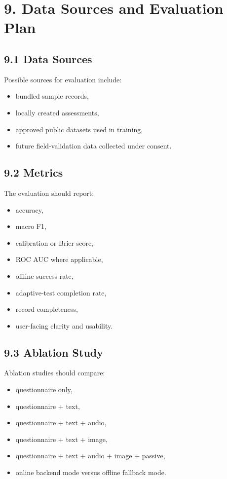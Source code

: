 \documentclass[11pt]{article}
\begin{document}
\section{9. Data Sources and Evaluation Plan}
\subsection{9.1 Data Sources}
Possible sources for evaluation include:
\begin{itemize}[leftmargin=*]
  \item bundled sample records,
  \item locally created assessments,
  \item approved public datasets used in training,
  \item future field-validation data collected under consent.
\end{itemize}

\subsection{9.2 Metrics}
The evaluation should report:
\begin{itemize}[leftmargin=*]
  \item accuracy,
  \item macro F1,
  \item calibration or Brier score,
  \item ROC AUC where applicable,
  \item offline success rate,
  \item adaptive-test completion rate,
  \item record completeness,
  \item user-facing clarity and usability.
\end{itemize}

\subsection{9.3 Ablation Study}
Ablation studies should compare:
\begin{itemize}[leftmargin=*]
  \item questionnaire only,
  \item questionnaire + text,
  \item questionnaire + text + audio,
  \item questionnaire + text + image,
  \item questionnaire + text + audio + image + passive,
  \item online backend mode versus offline fallback mode.
\end{itemize}
\end{document}
